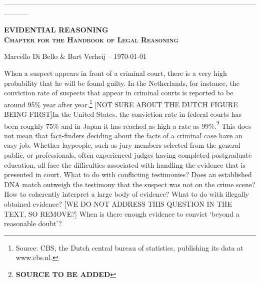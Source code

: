 \documentclass[10pt]{article}
\begin{document}
\thispagestyle{empty}

\vspace{-2cm}
\noindent
-----------------------------------------------------------------------------------------------------------------------


\vspace{5mm}
\noindent
\textsc{\large \bf  EVIDENTIAL REASONING \\ Chapter for the Handbook of Legal Reasoning}

\vspace{3mm}
\noindent
Marcello Di Bello \& Bart Verheij --  \today \\
\vspace{1cm}

\vspace{1cm}



\vspace{1cm}



\tableofcontents

\newpage

\noindent When a suspect appears in front of a criminal court, there is a very high probability that he will be found guilty. In the Netherlands, for instance, the conviction rate of suspects that appear in criminal courts is reported to be around 95\% year after year.\footnote{Source: CBS, the Dutch central bureau of statistics, publishing its data at www.cbs.nl.} [NOT SURE ABOUT THE DUTCH FIGURE BEING FIRST]In the United States, the conviction rate in federal courts has been roughly 75\% and in Japan it has reached as high a rate as 99\%.\footnote{\textbf{SOURCE TO BE ADDED}} This does not mean that fact-finders deciding about the facts of a criminal case have an easy job. Whether laypeople, such as jury members selected from the general public, or professionals, often experienced judges having completed postgraduate education, all face the difficulties associated with handling the evidence that is presented in court. What to do with conflicting testimonies? Does an established DNA match outweigh the testimony that the suspect was not on the crime scene? How to coherently interpret a large body of evidence? What to do with illegally obtained evidence? [WE DO NOT ADDRESS THIS QUESTION IN THE TEXT, SO REMOVE?] When is there enough evidence to convict `beyond a reasonable doubt'? 
\end{document}
